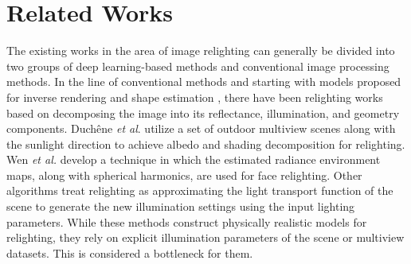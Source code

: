 \documentclass[final]{cvpr}
\begin{document}
\section{Related Works}
The existing works in the area of image relighting can generally be divided into two groups of deep learning-based methods and conventional image processing methods. In the line of conventional methods and starting with models proposed for inverse rendering \cite{6,25} and shape estimation \cite{5}, there have been relighting works based on decomposing the image into its reflectance, illumination, and geometry components. Duch\^{e}ne \emph{et al}. \cite{35} utilize a set of outdoor multiview scenes along with the sunlight direction to achieve albedo and shading decomposition for relighting. Wen \emph{et al.} \cite{36} develop a technique in which the estimated radiance environment maps, along with spherical harmonics, are used for face relighting. Other algorithms \cite{37,38,39} treat relighting as approximating the light transport function of the scene to generate the new illumination settings using the input lighting parameters.  While these methods construct physically realistic models for relighting, they rely on explicit illumination parameters of the scene or multiview datasets. This is considered a bottleneck for them.\\   
\end{document}
